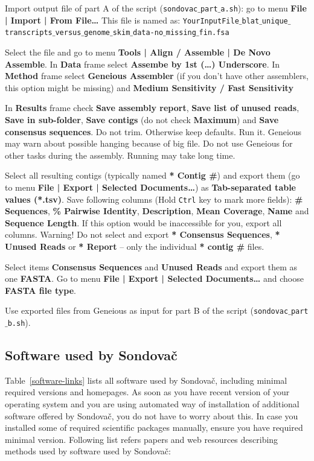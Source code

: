 \documentclass[a4paper, 11pt, twoside]{article}
\begin{document}
Import output file of part A of the script (\texttt{sondovac$\_$part$\_$a.sh}): go to menu \textbf{File | Import | From File\ldots} This file is named as: \texttt{YourInputFile$\_$\allowbreak blat$\_$\allowbreak unique$\_$\allowbreak transcripts$\_$\allowbreak versus$\_$\allowbreak genome$\_$\allowbreak skim$\_$\allowbreak data-no$\_$\allowbreak missing$\_$\allowbreak fin.fsa}

Select the file and go to menu \textbf{Tools | Align / Assemble | De Novo Assemble}. In \textbf{Data} frame select \textbf{Assembe by 1st (\ldots) Underscore}. In \textbf{Method} frame select \textbf{Geneious Assembler} (if you don't have other assemblers, this option might be missing) and \textbf{Medium Sensitivity / Fast Sensitivity}

In \textbf{Results} frame check \textbf{Save assembly report}, \textbf{Save list of unused reads}, \textbf{Save in sub-folder}, \textbf{Save contigs} (do not check \textbf{Maximum}) and \textbf{Save consensus sequences}. Do not trim. Otherwise keep defaults. Run it. Geneious may warn about possible hanging because of big file. Do not use Geneious for other tasks during the assembly. Running may take long time.

Select all resulting contigs (typically named \textbf{* Contig \#}) and export them (go to menu \textbf{File | Export | Selected Documents\ldots}) as \textbf{Tab-separated table values (*.tsv)}. Save following columns (Hold \texttt{Ctrl} key to mark more fields): \textbf{\# Sequences}, \textbf{\% Pairwise Identity}, \textbf{Description}, \textbf{Mean Coverage}, \textbf{Name} and \textbf{Sequence Length}. If this option would be inaccessible for you, export all columns. Warning! Do not select and export \textbf{* Consensus Sequences}, \textbf{* Unused Reads} or \textbf{* Report} -- only the individual \textbf{* contig \#} files.

Select items \textbf{Consensus Sequences} and \textbf{Unused Reads} and export them as one \textbf{FASTA}. Go to menu \textbf{File | Export | Selected Documents\ldots} and choose \textbf{FASTA file type}.

Use exported files from Geneious as input for part B of the script (\texttt{sondovac$\_$part$\_$b.sh}).

\subsection{Software used by Sondovač}

Table~\ref{software-links} lists all software used by Sondovač, including minimal required versions and homepages. As soon as you have recent version of your operating system and you are using automated way of installation of additional software offered by Sondovač, you do not have to worry about this. In case you installed some of required scientific packages manually, ensure you have required minimal version. Following list refers papers and web resources describing methods used by software used by Sondovač:
\end{document}
